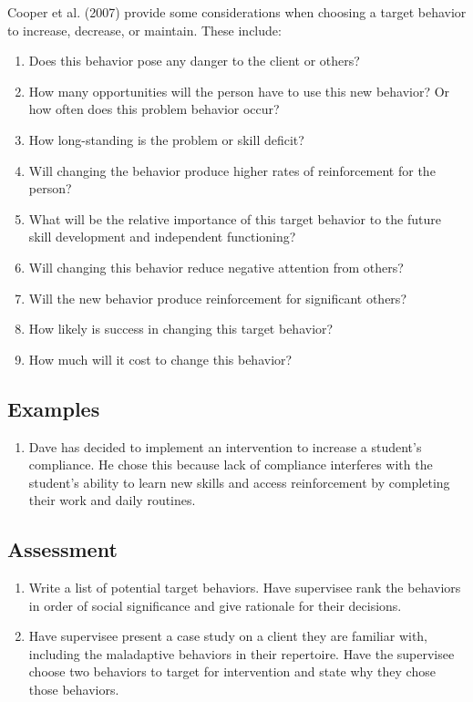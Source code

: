 Cooper et al. (2007) provide some considerations when choosing a target behavior to increase, decrease, or maintain. These include:
\begin{enumerate}
\item Does this behavior pose any danger to the client or others?
\item How many opportunities will the person have to use this new behavior? Or how often does this problem behavior occur?
\item How long-standing is the problem or skill deficit?
\item Will changing the behavior produce higher rates of reinforcement for the person?
\item What will be the relative importance of this target behavior to the future skill development and independent functioning?
\item Will changing this behavior reduce negative attention from others?
\item Will the new behavior produce reinforcement for significant others?
\item How likely is success in changing this target behavior?
\item How much will it cost to change this behavior?
\end{enumerate}
%
\subsection{Examples}
\begin{enumerate}
\item Dave has decided to implement an intervention to increase a student's compliance. He chose this because lack of compliance interferes with the student's ability to learn new skills and access reinforcement by completing their work and daily routines.
\end{enumerate}
%
\subsection{Assessment}
\begin{enumerate}
\item Write a list of potential target behaviors. Have supervisee rank the behaviors in order of social significance and give rationale for their decisions.
\item Have supervisee present a case study on a client they are familiar with, including the maladaptive behaviors in their repertoire. Have the supervisee choose two behaviors to target for intervention and state why they chose those behaviors.
\end{enumerate}
%
